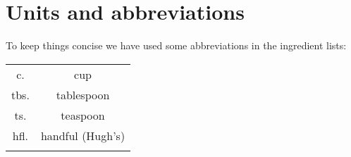 \section*{Units and abbreviations}
To keep things concise we have used some abbreviations in the ingredient lists:
\begin{table}[h]
\centering
\begin{tabular}{cc}
    c.	& cup                     \\
    tbs. & tablespoon                     \\
    ts.	& teaspoon                    \\
    hfl. & handful (Hugh's) \\
    \multicolumn{1}{l}{} & \multicolumn{1}{l}{}
\end{tabular}
\end{table}